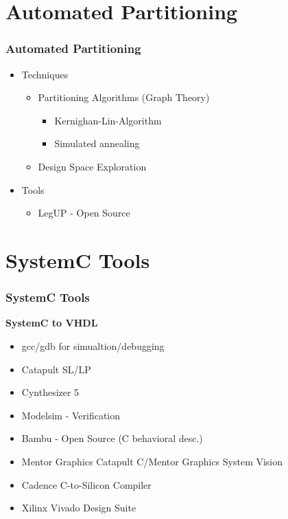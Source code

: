 \documentclass{beamer}
\begin{document}
\section{Automated Partitioning}
\begin{frame}\frametitle{Automated Partitioning} 

\begin{itemize}
  \item Techniques
  \begin{itemize}
   \item Partitioning Algorithms (Graph Theory)
    \begin{itemize}
      \item{Kernighan-Lin-Algorithm}
      \item{Simulated annealing}  
    \end{itemize}
   \item Design Space Exploration
  \end{itemize}
  
  \item{Tools}
    \begin{itemize}
   \item{LegUP - Open Source}
    \end{itemize}
 \end{itemize}
\end{frame}


\section{SystemC Tools}
\begin{frame}\frametitle{SystemC Tools} 
\textbf{SystemC to VHDL}
    \begin{itemize}
      \item{gcc/gdb for simualtion/debugging}
      \item{Catapult SL/LP}
      \item{Cynthesizer 5 }
      \item{Modelsim - Verification}
      \item{Bambu - Open Source (C behavioral desc.)}
      \item{Mentor Graphics Catapult C/Mentor Graphics System Vision}
      \item{Cadence C-to-Silicon Compiler}
      \item{Xilinx Vivado Design Suite}
    \end{itemize}
\end{frame}
\end{document}
